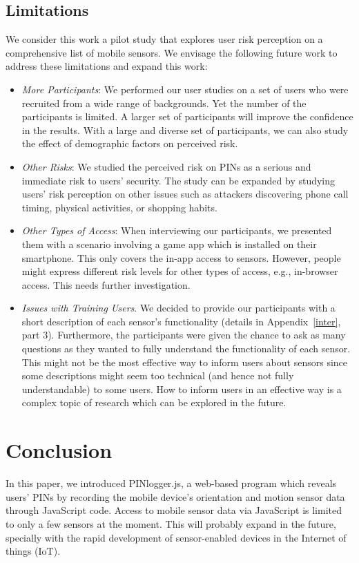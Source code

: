 \documentclass[10pt,twocolumn]{article}
\begin{document}
\subsection{Limitations}
We consider this work a pilot study that explores user risk perception on a comprehensive list of mobile sensors. We envisage the following future work to address these limitations and expand this work: 
\begin{itemize}
\item \textit{More Participants}: We performed our user studies on a set of users who were recruited from a wide range of backgrounds. Yet the number of the participants is limited. A larger set of participants will improve the confidence in the results. With a large and diverse set of participants, we can also study the effect of demographic factors on perceived risk. 

\item \textit{Other Risks}: We studied the perceived risk on PINs as a serious and immediate risk to users' security. The study can be expanded by studying users' risk perception on other issues such as attackers discovering phone call timing, physical activities, or shopping habits. 

\item \textit{Other Types of Access}: When interviewing our participants, we presented them with a scenario involving a game app which is installed on their smartphone. This only covers the in-app access to sensors. However, people might express different risk levels for other types of access, e.g., in-browser access. This needs further investigation. 

\item \textit{Issues with Training Users}. We decided to provide our participants with a short description of each sensor's functionality (details in Appendix~\ref{inter}, part 3). Furthermore, the participants were given the chance to ask as many questions as they wanted to fully understand the functionality of each sensor. This might not be the most effective way to inform users about sensors since some descriptions might seem too technical (and hence not fully understandable) to some users. How to inform users in an effective way is a complex topic of research which can be explored in the future. 

\end{itemize}


\section{Conclusion}
\label{Con}
In this paper, we introduced PINlogger.js, a web-based program which reveals users' PINs by recording the mobile device's orientation and motion sensor data through JavaScript code. 
Access to mobile sensor data via JavaScript is limited to only a few sensors at the moment. This will probably expand in the future, specially with the rapid development of sensor-enabled devices in the Internet of things (IoT). 
\end{document}
